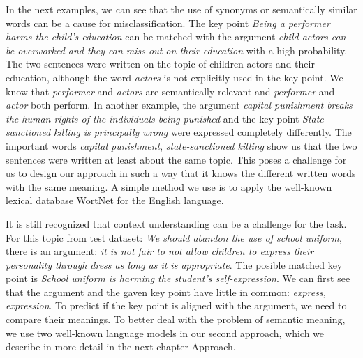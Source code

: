 In the next examples, we can see that the use of synonyms or semantically similar words can be a cause for misclassification. The key point \textit{Being a performer harms the child's education} can be matched with the argument \textit{child actors can be overworked and they can miss out on their education} with a high probability. The two sentences were written on the topic of children actors and their education, although the word \textit{actors} is not explicitly used in the key point. We know that \textit{performer} and \textit{actors} are semantically relevant and \textit{performer} and \textit{actor} both perform. In another example, the argument \textit{capital punishment breaks the human rights of the individuals being punished} and the key point \textit{State-sanctioned killing is principally wrong} were expressed completely differently. The important words \textit{capital punishment}, \textit{state-sanctioned killing} show us that the two sentences were written at least about the same topic. This poses a challenge for us to design our approach in such a way that it knows the different written words with the same meaning. A simple method we use is to apply the well-known lexical database WortNet for the English language.

It is still recognized that context understanding can be a challenge for the task. For this topic from test dataset:
\textit{We should abandon the use of school uniform}, there is an argument: \textit{it is not fair to not allow children to express their personality through dress as long as it is appropriate}. The posible matched key point is \textit{School uniform is harming the student's self-expression}. We can first see that the argument and the gaven key point have little in common: \textit{express, expression}. To predict if the key point is aligned with the argument, we need to compare their meanings. To better deal with the problem of semantic meaning, we use two well-known language models in our second approach, which we describe in more detail in the next chapter Approach.